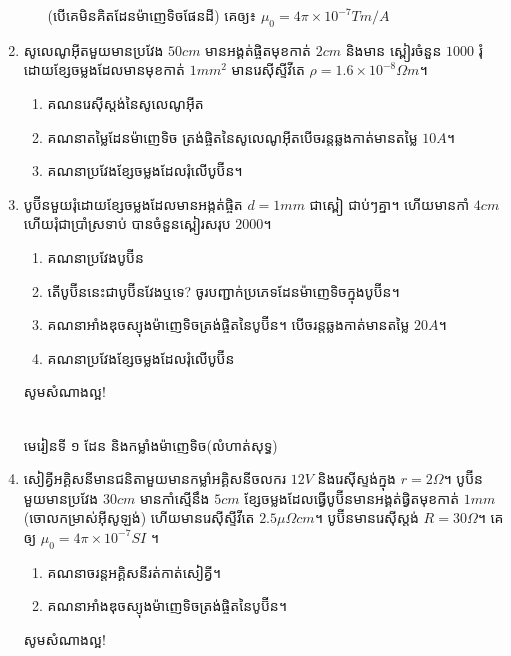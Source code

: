 \documentclass[12pt, a4paper]{article}
\begin{document}
\begin{enumerate}[m]
\begin{enumerate}[k]
		(បើគេមិនគិតដែនម៉ាញេទិចផែនដី) គេឲ្យ៖ $\mu_0=4\pi \times10^{-7}Tm/A$
	\end{enumerate}
	\item សូលេណូអុីតមួយមានប្រវែង $50cm$ មានអង្គត់ផ្ចិតមុខកាត់ $2cm$ និងមាន ស្ពៀរចំនួន $1000$ រុំដោយខ្សែចម្លងដែលមានមុខកាត់ $1mm^2$ មានរេសុីស្ទីវីតេ $\rho=1.6\times10^{-8}\Omega m$។
	\begin{enumerate}[k]
		\item គណនរេសុីស្តង់នៃសូលេណូអុីត
		\item គណនាតម្លៃដែនម៉ាញេទិច ត្រង់ផ្ចិតនៃសូលេណូអុីតបើចរន្តឆ្លងកាត់មានតម្លៃ $10A$។
		\item គណនាប្រវែងខ្សែចម្លងដែលរុំលើបូប៊ីន។
	\end{enumerate}
	\item បូប៊ីនមួយរុំដោយខ្សែចម្លងដែលមានអង្កត់ផ្ចិត $d=1mm$ ជាស្ពៀ ជាប់ៗគ្នា។ ហើយមានកាំ $4cm$ ហើយរុំជាប្រាំស្រទាប់ បានចំនួនស្ពៀរសរុប $2000$។
	\begin{enumerate}[k]
		\item គណនាប្រវែងបូប៊ីន
		\item តើបូប៊ីននេះជាបូប៊ីនវែងឬទេ? ចូរបញ្ជាក់ប្រភេទដែនម៉ាញេទិចក្នុងបូប៊ីន។
		\item គណនាអាំងឌុចស្យុងម៉ាញេទិចត្រង់ផ្ចិតនៃបូប៊ីន។ បើចរន្តឆ្លងកាត់មានតម្លៃ $20A$។
		\item គណនាប្រវែងខ្សែចម្លងដែលរុំលើបូប៊ីន
	\end{enumerate}	
	\begin{center}
		\sffamily\color{black}
		សូមសំណាងល្អ!
	\end{center}\newpage
	\begin{center}
		\sffamily\color{black}
		\\
		មេរៀនទី​ ១ ដែន និងកម្លាំងម៉ាញេទិច(លំហាត់សុទ្ធ)
	\end{center}
	\item សៀគ្វីអគ្គិសនីមានជនិតាមួយមានកម្លាំអគ្គិសនីចលករ $12V$ និងរេសុីស្ទង់ក្នុង $r=2\Omega$។ បូប៊ីនមួយមានប្រវែង $30cm$ មានកាំស្មើនឹង $5cm$ ខ្សែចម្លងដែលធ្វើបូប៊ីនមានអង្គត់ផ្វិតមុខកាត់ $1mm$(ចោលកម្រាស់អុីសូឡង់) ហើយមានរេសុីស្ទីវីតេ $2.5\mu\Omega cm$។ បូប៊ីនមានរេសុីស្តង់ $R=30\Omega$។ គេឲ្យ $\mu_0=4\pi\times10^{-7}SI$ ។
	\begin{enumerate}[k,2]
		\item គណនាចរន្តអគ្គិសនីរត់កាត់សៀគ្វី។
		\item គណនាអាំងឌុចស្យុងម៉ាញេទិចត្រង់ផ្ចិតនៃបូប៊ីន។
	\end{enumerate}
	\begin{center}
		\sffamily\color{black}
		សូមសំណាងល្អ!
	\end{center}\newpage
\end{enumerate}
\end{document}
